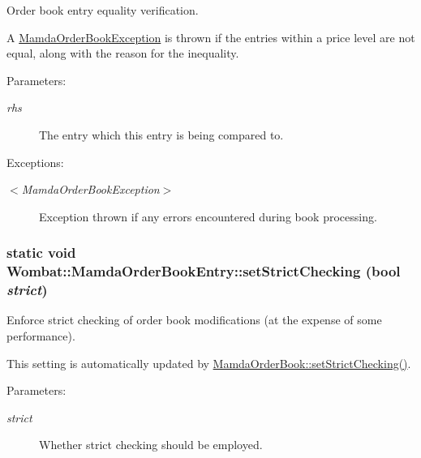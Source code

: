 Order book entry equality verification. 

A \hyperlink{classWombat_1_1MamdaOrderBookException}{Mamda\-Order\-Book\-Exception} is thrown if the entries within a price level are not equal, along with the reason for the inequality.

\begin{Desc}
\item[Parameters:]
\begin{description}
\item[{\em rhs}]The entry which this entry is being compared to.\end{description}
\end{Desc}
\begin{Desc}
\item[Exceptions:]
\begin{description}
\item[{\em $<$Mamda\-Order\-Book\-Exception$>$}]Exception thrown if any errors encountered during book processing. \end{description}
\end{Desc}
\hypertarget{classWombat_1_1MamdaOrderBookEntry_b39d4646a59b7285c4f4fe6fb71ef43a}{
\subsubsection[setStrictChecking]{\setlength{\rightskip}{0pt plus 5cm}static void Wombat::Mamda\-Order\-Book\-Entry::set\-Strict\-Checking (bool {\em strict})}}
\label{classWombat_1_1MamdaOrderBookEntry_b39d4646a59b7285c4f4fe6fb71ef43a}


Enforce strict checking of order book modifications (at the expense of some performance). 

This setting is automatically updated by \hyperlink{classWombat_1_1MamdaOrderBook_469f47b99322ce6b9e002429a75a8efd}{Mamda\-Order\-Book::set\-Strict\-Checking()}.

\begin{Desc}
\item[Parameters:]
\begin{description}
\item[{\em strict}]Whether strict checking should be employed. \end{description}
\end{Desc}
